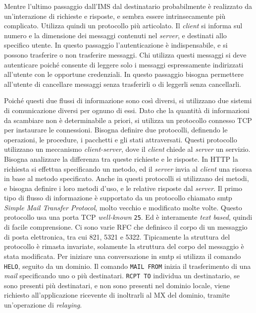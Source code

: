 \documentclass{article}
\numberwithin{equation}{subsection}
\begin{document}
Mentre l'ultimo passaggio dall'IMS dal destinatario probabilmente è realizzato da un'interazione di richieste e risposte, e sembra essere intrinsecamente più complicato. Utilizza quindi un protocollo più articolato. 
Il \textit{client} si informa sul numero e la dimensione dei messaggi contenuti nel \textit{server}, e destinati allo specifico utente. In questo passaggio l'autenticazione è indispensabile, e si possono trasferire o non trasferire messaggi. 
Chi utilizza questi messaggi si deve autenticare poiché consente di leggere solo i messaggi espressamente indirizzati all'utente con le opportune credenziali. In questo passaggio bisogna permettere all'utente di cancellare messaggi senza trasferirli o di leggerli senza cancellarli. 


Poiché questi due flussi di informazione sono così diversi, si utilizzano due sistemi di comunicazione diversi per ognuno di essi. Dato che la quantità di informazioni da scambiare non è determinabile a priori, si utilizza un protocollo connesso \textcolor{Bittersweet}{TCP} per instaurare le connessioni. Bisogna definire due protocolli, definendo le operazioni, le procedure, i pacchetti e gli stati attraversati. 
Questi protocollo utilizzano un meccanismo \textit{client-server}, dove il \textit{client} chiede al \textit{server} un servizio. Bisogna analizzare la differenza tra queste richieste e le risposte. In \textcolor{NavyBlue}{HTTP} la richiesta si effettua specificando un metodo, ed il \textit{server} invia al \textit{client} una risorsa in base al metodo specificato. 
Anche in questi protocolli si utilizzano dei metodi, e bisogna definire i loro metodi d'uso, e le relative risposte dal \textit{server}. 
Il primo tipo di flusso di informazione è supportato da un protocollo chiamato smtp \textit{Simple Mail Transfer Protocol}, molto vecchio e modificato molte volte. Questo protocollo usa una porta \textcolor{Bittersweet}{TCP} \textit{well-known} \verb|25|. Ed è interamente \textit{text based}, quindi di facile comprensione. Ci sono varie RFC che definisco il corpo di un messaggio di posta elettronica, tra cui 821, 5321 e 5322. Tipicamente la struttura del protocollo è rimasta invariate, solamente la struttura del corpo del messaggio è stata modificata. 
Per iniziare una conversazione in smtp si utilizza il comando \verb|HELO|, seguito da un dominio. Il comando \verb|MAIL FROM| inizia il trasferimento di una \textit{mail} specificando uno o più destinatari. 
\verb|RCPT TO| individua un destinatario, se sono presenti più destinatari, e non sono presenti nel dominio locale, viene richiesto all'applicazione ricevente di inoltrarli al MX del dominio, tramite un'operazione di \textit{relaying}. 
\end{document}
